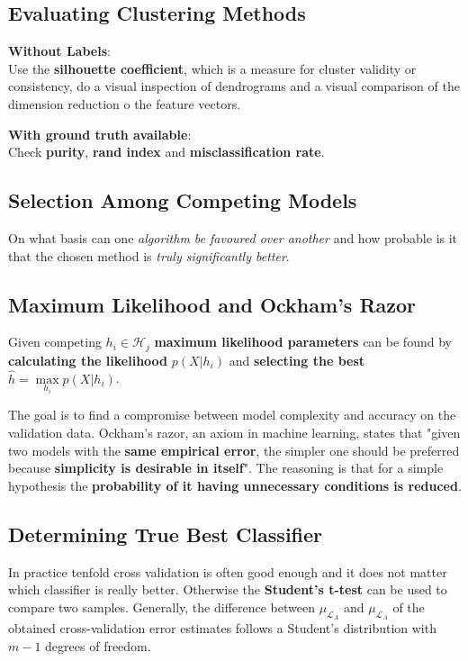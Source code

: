 \documentclass[11pt]{article}
\theoremstyle{definition}
\newcommand*\Hilbert{\ensuremath{\mathcal{H}}}
\begin{document}
\subsection{Evaluating Clustering Methods}
\textbf{Without Labels}:\\
Use the \textbf{silhouette coefficient}, which is a measure for cluster validity or consistency, do a visual inspection of dendrograms and a visual comparison of the dimension reduction o the feature vectors.

\vspace{1em}
\noindent
\textbf{With ground truth available}:\\
Check \textbf{purity}, \textbf{rand index} and \textbf{misclassification rate}.

\subsection{Selection Among Competing Models}
On what basis can one \emph{algorithm be favoured over another} and how probable is it that the chosen method is \emph{truly significantly better}.

\subsection{Maximum Likelihood and Ockham's Razor}
Given competing $h_i \in \Hilbert_j$ \textbf{maximum likelihood parameters} can be found by \textbf{calculating the likelihood} $p(X|h_i)$ and \textbf{selecting the best} $\hat{h} = \underset{h_i}{\max} p(X|h_i)$.

The goal is to find a compromise between model complexity and accuracy on the validation data. Ockham's razor, an axiom in machine learning, states that "given two models with the \textbf{same empirical error}, the simpler one should be preferred because \textbf{simplicity is desirable in itself}". The reasoning is that for a simple hypothesis the \textbf{probability of it having unnecessary conditions is reduced}.

\subsection{Determining True Best Classifier}
In practice tenfold cross validation is often good enough and it does not matter which classifier is really better. Otherwise the \textbf{Student's t-test} can be used to compare two samples. Generally, the difference between $\mu_{\mathcal{L}_A}$ and $\mu_{\mathcal{L}_A}$ of the obtained cross-validation error estimates follows a Student's distribution with $m-1$ degrees of freedom.
\end{document}
